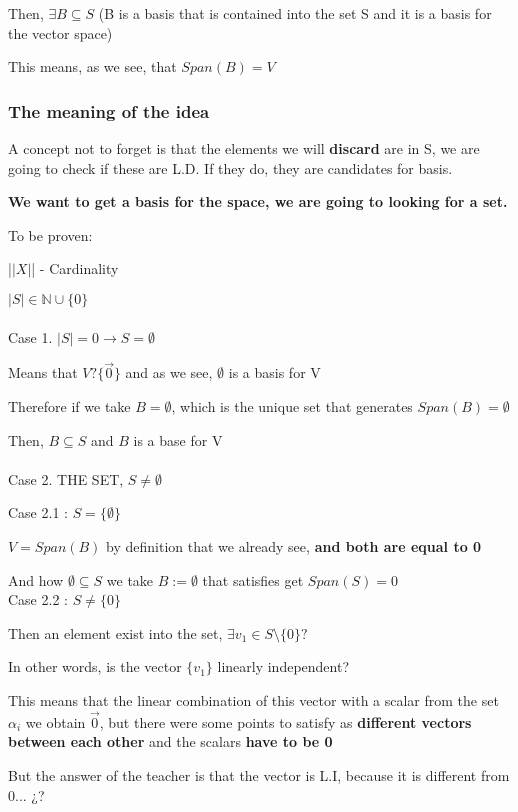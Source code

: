 \documentclass{article}
\begin{document}
Then, \(\exists B\subseteq S\) (B is a basis that is contained into the set S and it is a basis for the vector space)

This means, as we see, that \(Span(B) = V\)

\subsubsection{The meaning of the idea}
A concept not to forget is that the elements we will \textbf{discard} are in S, we are going to check if these are L.D. If they do, they are candidates for basis.

\textbf{We want to get a basis for the space, we are going to looking for a set.}

To be proven:

|\(|X|\)| - Cardinality

\(|S| \in \mathbb{N}\cup \{0\}\)
\\
\\
Case 1. \(|S| = 0 \rightarrow S = \emptyset\)

Means that \(V ? \{\vec{0}\}\) and as we see, \(\emptyset\) is a basis for V

Therefore if we take \(B = \emptyset\), which is the unique set that generates \(Span(B) = \emptyset\)

Then, \(B \subseteq S\) and \(B\) is a base for V
\\
\\
Case 2. THE SET, \(S \neq \emptyset\)

Case 2.1 : \(S = \{\emptyset\}\)

\(V = Span(B)\) by definition that we already see, \textbf{and both are equal to 0}

And how \(\emptyset \subseteq S\) we take \(B := \emptyset\) that satisfies get \(Span(S) = 0\)
\\

Case 2.2 : \(S \neq \{0\}\)

Then an element exist into the set, \(\exists v_1 \in S \text{\textbackslash} \{0\}?\)

In other words, is the vector \(\{v_1\}\) linearly independent?

This means that the linear combination of this vector with a scalar from the set \(\alpha_i\) we obtain \(\vec{0}\), but there were some points to satisfy as \textbf{different vectors between each other} and the scalars \textbf{have to be 0}

But the answer of the teacher is that the vector is L.I, because it is different from 0... ¿?
\\
\end{document}
